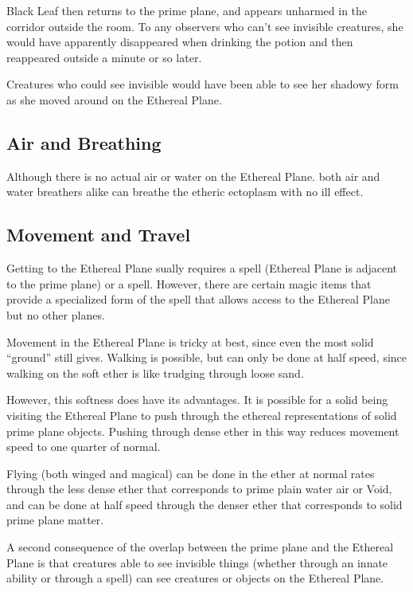 \begin{multicols*}{2}
{Black Leaf then returns to the prime plane, and appears unharmed in the corridor outside the room. To any observers who can’t see invisible creatures, she would have apparently disappeared when drinking the potion and then reappeared outside a minute or so later.

Creatures who could see invisible would have been able to see her shadowy form as she moved around on the Ethereal Plane.}

\subsection{Air and Breathing}
Although there is no actual air or water on the Ethereal Plane. both air and water breathers alike can breathe the etheric ectoplasm with no ill effect.

\subsection{Movement and Travel}
Getting to the Ethereal Plane sually requires a  spell (Ethereal Plane is adjacent to the prime plane) or a  spell. However, there are certain magic items that provide a specialized form of the  spell that allows access to the Ethereal Plane but no other planes.

Movement in the Ethereal Plane is tricky at best, since even the most solid “ground” still gives. Walking is possible, but can only be done at half speed, since walking on the soft ether is like trudging through loose sand.

However, this softness does have its advantages. It is possible for a solid being visiting the Ethereal Plane to push through the ethereal representations of solid prime plane objects. Pushing through dense ether in this way reduces movement speed to one quarter of normal.

Flying (both winged and magical) can be done in the ether at normal rates through the less dense ether that corresponds to prime plain water air or Void, and can be done at half speed through the denser ether that corresponds to solid prime plane matter.

A second consequence of the overlap between the prime plane and the Ethereal Plane is that creatures able to see invisible things (whether through an innate ability or through a  spell) can see creatures or objects on the Ethereal Plane.


\end{multicols*}
